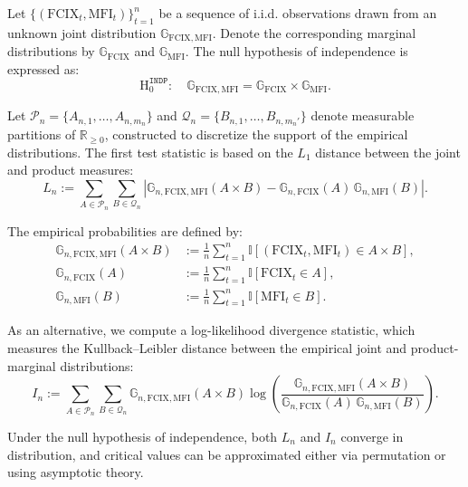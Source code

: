 \documentclass[pdflatex,sn-mathphys-num]{sn-jnl}%
\theoremstyle{thmstyleone}%
\theoremstyle{thmstyletwo}%
\theoremstyle{thmstylethree}%
\begin{document}
Let $\{(\mathrm{FCIX}_t, \mathrm{MFI}_t)\}_{t=1}^{n}$ be a sequence of i.i.d. observations drawn from an unknown joint distribution $\mathbb{G}_{\mathrm{FCIX}, \mathrm{MFI}}$. Denote the corresponding marginal distributions by $\mathbb{G}_{\mathrm{FCIX}}$ and $\mathbb{G}_{\mathrm{MFI}}$. The null hypothesis of independence is expressed as:
\begin{equation*}
	\mathrm{H}_0^{\mathtt{INDP}}: \quad \mathbb{G}_{\mathrm{FCIX}, \mathrm{MFI}} = \mathbb{G}_{\mathrm{FCIX}} \times \mathbb{G}_{\mathrm{MFI}}.
\end{equation*}

Let $\mathcal{P}_n = \{A_{n,1}, \dots, A_{n,m_n}\}$ and $\mathcal{Q}_n = \{B_{n,1}, \dots, B_{n,m_n'}\}$ denote measurable partitions of $\mathbb{R}_{\geq 0}$, constructed to discretize the support of the empirical distributions. The first test statistic is based on the $L_1$ distance between the joint and product measures:
\begin{equation}
	\label{Eq:L_1_statistic}
	L_n := \sum_{A \in \mathcal{P}_n} \sum_{B \in \mathcal{Q}_n} \left| \mathbb{G}_{n,\mathrm{FCIX},\mathrm{MFI}}(A \times B) - \mathbb{G}_{n,\mathrm{FCIX}}(A)\, \mathbb{G}_{n,\mathrm{MFI}}(B) \right|.
\end{equation}

The empirical probabilities are defined by:
\begin{align}
	\mathbb{G}_{n,\mathrm{FCIX},\mathrm{MFI}}(A \times B) &:= \frac{1}{n} \sum_{t=1}^{n} \mathbb{I}[(\mathrm{FCIX}_t, \mathrm{MFI}_t) \in A \times B], \\
	\mathbb{G}_{n,\mathrm{FCIX}}(A) &:= \frac{1}{n} \sum_{t=1}^{n} \mathbb{I}[\mathrm{FCIX}_t \in A], \\
	\mathbb{G}_{n,\mathrm{MFI}}(B) &:= \frac{1}{n} \sum_{t=1}^{n} \mathbb{I}[\mathrm{MFI}_t \in B].
\end{align}

As an alternative, we compute a log-likelihood divergence statistic, which measures the Kullback--Leibler distance between the empirical joint and product-marginal distributions:
\begin{equation}
	\label{Eq:log_L_statistic}
	I_n := \sum_{A \in \mathcal{P}_n} \sum_{B \in \mathcal{Q}_n} \mathbb{G}_{n,\mathrm{FCIX},\mathrm{MFI}}(A \times B) \log \left( \frac{\mathbb{G}_{n,\mathrm{FCIX},\mathrm{MFI}}(A \times B)}{\mathbb{G}_{n,\mathrm{FCIX}}(A)\, \mathbb{G}_{n,\mathrm{MFI}}(B)} \right).
\end{equation}

Under the null hypothesis of independence, both $L_n$ and $I_n$ converge in distribution, and critical values can be approximated either via permutation or using asymptotic theory.
\end{document}
